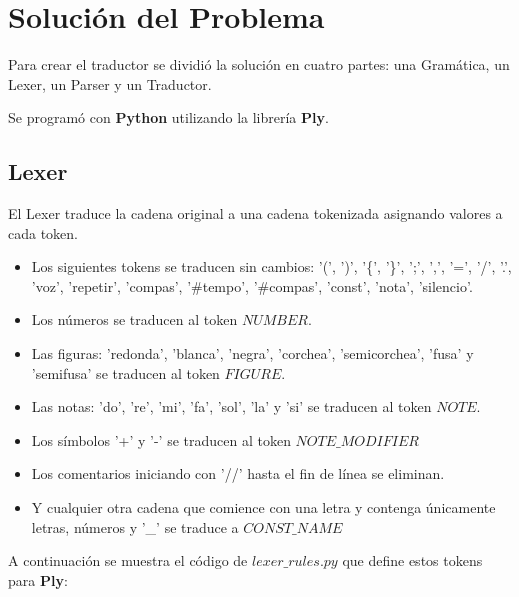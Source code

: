 \section{Solución del Problema}

Para crear el traductor se dividió la solución en cuatro partes: una Gramática, un Lexer, un Parser y un Traductor.

Se programó con \textbf{Python} utilizando la librería \textbf{Ply}.

\subsection{Lexer}

El Lexer traduce la cadena original a una cadena tokenizada asignando valores a cada token.

\begin{itemize}
	\item Los siguientes tokens se traducen sin cambios: '(', ')', '\{', '\}', ';', ',', '=', '/', '.', 'voz', 'repetir', 'compas', '\#tempo', '\#compas', 'const', 'nota', 'silencio'.

	\item Los números se traducen al token $NUMBER$.

	\item Las figuras: 'redonda', 'blanca', 'negra', 'corchea', 'semicorchea', 'fusa' y 'semifusa' se traducen al token $FIGURE$.

	\item Las notas: 'do', 're', 'mi', 'fa', 'sol', 'la' y 'si' se traducen al token $NOTE$.

	\item Los símbolos '+' y '-' se traducen al token $NOTE\_MODIFIER$

	\item Los comentarios iniciando con '//' hasta el fin de línea se eliminan.

	\item Y cualquier otra cadena que comience con una letra y contenga únicamente letras, números y '\_' se traduce a $CONST\_NAME$
\end{itemize}

A continuación se muestra el código de $lexer\_rules.py$ que define estos tokens para \textbf{Ply}:

